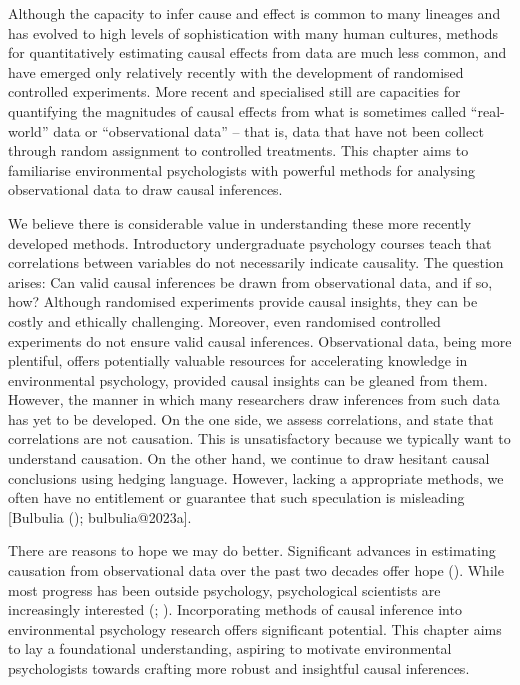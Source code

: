 \documentclass[
  singlecolumn]{article}
\begin{document}
Although the capacity to infer cause and effect is common to many
lineages and has evolved to high levels of sophistication with many
human cultures, methods for quantitatively estimating causal effects
from data are much less common, and have emerged only relatively
recently with the development of randomised controlled experiments. More
recent and specialised still are capacities for quantifying the
magnitudes of causal effects from what is sometimes called
``real-world'' data or ``observational data'' -- that is, data that have
not been collect through random assignment to controlled treatments.
This chapter aims to familiarise environmental psychologists with
powerful methods for analysing observational data to draw causal
inferences.

We believe there is considerable value in understanding these more
recently developed methods. Introductory undergraduate psychology
courses teach that correlations between variables do not necessarily
indicate causality. The question arises: Can valid causal inferences be
drawn from observational data, and if so, how? Although randomised
experiments provide causal insights, they can be costly and ethically
challenging. Moreover, even randomised controlled experiments do not
ensure valid causal inferences. Observational data, being more
plentiful, offers potentially valuable resources for accelerating
knowledge in environmental psychology, provided causal insights can be
gleaned from them. However, the manner in which many researchers draw
inferences from such data has yet to be developed. On the one side, we
assess correlations, and state that correlations are not causation. This
is unsatisfactory because we typically want to understand causation. On
the other hand, we continue to draw hesitant causal conclusions using
hedging language. However, lacking a appropriate methods, we often have
no entitlement or guarantee that such speculation is misleading
{[}Bulbulia (); bulbulia@2023a{]}.

There are reasons to hope we may do better. Significant advances in
estimating causation from observational data over the past two decades
offer hope (). While
most progress has been outside psychology, psychological scientists are
increasingly interested (;
). Incorporating methods of causal
inference into environmental psychology research offers significant
potential. This chapter aims to lay a foundational understanding,
aspiring to motivate environmental psychologists towards crafting more
robust and insightful causal inferences.
\end{document}
